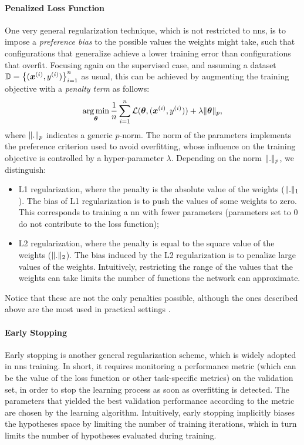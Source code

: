 \paragraph{Penalized Loss Function}
One very general regularization technique, which is not restricted to \glspl{nn}, is to impose a \emph{preference bias} to the possible values the weights might take, such that configurations that generalize achieve a lower training error than configurations that overfit. Focusing again on the supervised case, and assuming a dataset $\Data = \Set{(\PatternVector{x}{i}, \Pattern{y}{i})}_{i=1}^n$ as usual, this can be achieved by augmenting the training objective with a \emph{penalty term} as follows:
$$\argmin_{\Param} \frac{1}{n} \sum_{i=1}^n \Loss(\Param, (\PatternVector{x}{i}, \Pattern{y}{i})) + \lambda\norm{\Param}_p,$$
where $\mathopen\| . \mathclose\|_p$ indicates a generic $p$-norm. The norm of the parameters implements the preference criterion used to avoid overfitting, whose influence on the training objective is controlled by a hyper-parameter $\lambda$. Depending on the norm $\mathopen\| . \mathclose\|_p$, we distinguish:
\begin{itemize}
    \item L1 regularization, where the penalty is the absolute value of the weights ($\mathopen\| . \mathclose\|_1$). The bias of L1 regularization is to push the values of some weights to zero. This corresponds to training a \gls{nn} with fewer parameters (parameters set to 0 do not contribute to the loss function);
    \item L2 regularization, where the penalty is equal to the square value of the weights ($\mathopen\| . \mathclose\|_2$). The bias induced by the L2 regularization is to penalize large values of the weights. Intuitively, restricting the range of the values that the weights can take limits the number of functions the network can approximate.
\end{itemize}
Notice that these are not the only penalties possible, although the ones described above are the most used in practical settings \citep{hastie2009elements}.

\paragraph{Early Stopping}
Early stopping \citep{prechelt1998earlystopping} is another general regularization scheme, which is widely adopted in \glspl{nn} training. In short, it requires monitoring a performance metric (which can be the value of the loss function or other task-specific metrics) on the validation set, in order to stop the learning process as soon as overfitting is detected. The parameters that yielded the best validation performance according to the metric are chosen by the learning algorithm. Intuitively, early stopping implicitly biases the hypotheses space by limiting the number of training iterations, which in turn limits the number of hypotheses evaluated during training.

